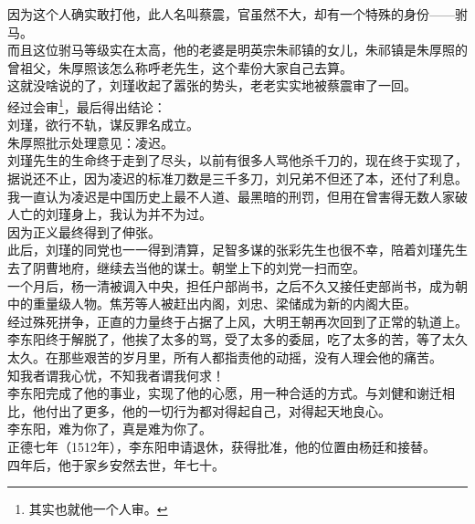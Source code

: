 \begin{multicols}{\theparacolNo}
因为这个人确实敢打他，此人名叫蔡震，官虽然不大，却有一个特殊的身份——驸马。\\

而且这位驸马等级实在太高，他的老婆是明英宗朱祁镇的女儿，朱祁镇是朱厚照的曾祖父，朱厚照该怎么称呼老先生，这个辈份大家自己去算。\\

这就没啥说的了，刘瑾收起了嚣张的势头，老老实实地被蔡震审了一回。\\

经过会审\footnote{其实也就他一个人审。}，最后得出结论：\\

刘瑾，欲行不轨，谋反罪名成立。\\

朱厚照批示处理意见：凌迟。\\

刘瑾先生的生命终于走到了尽头，以前有很多人骂他杀千刀的，现在终于实现了，据说还不止，因为凌迟的标准刀数是三千多刀，刘兄弟不但还了本，还付了利息。\\

我一直认为凌迟是中国历史上最不人道、最黑暗的刑罚，但用在曾害得无数人家破人亡的刘瑾身上，我认为并不为过。\\

因为正义最终得到了伸张。\\

此后，刘瑾的同党也一一得到清算，足智多谋的张彩先生也很不幸，陪着刘瑾先生去了阴曹地府，继续去当他的谋士。朝堂上下的刘党一扫而空。\\

一个月后，杨一清被调入中央，担任户部尚书，之后不久又接任吏部尚书，成为朝中的重量级人物。焦芳等人被赶出内阁，刘忠、梁储成为新的内阁大臣。\\

经过殊死拼争，正直的力量终于占据了上风，大明王朝再次回到了正常的轨道上。\\

李东阳终于解脱了，他挨了太多的骂，受了太多的委屈，吃了太多的苦，等了太久太久。在那些艰苦的岁月里，所有人都指责他的动摇，没有人理会他的痛苦。\\

知我者谓我心忧，不知我者谓我何求！\\

李东阳完成了他的事业，实现了他的心愿，用一种合适的方式。与刘健和谢迁相比，他付出了更多，他的一切行为都对得起自己，对得起天地良心。\\

李东阳，难为你了，真是难为你了。\\

正德七年（1512年），李东阳申请退休，获得批准，他的位置由杨廷和接替。\\

四年后，他于家乡安然去世，年七十。\\
\ifnum{}
	\end{multicols}
\fi
\newpage
